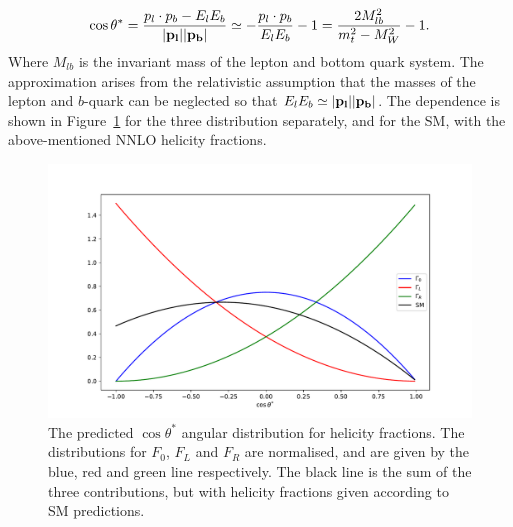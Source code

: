 \documentclass[12pt,a4paper]{article}
\numberwithin{equation}{section}
\begin{document}
\begin{equation}
  \cos \theta^*=\frac{p_l\cdot p_b-E_lE_b}{\abs{\vb{p_l}}\abs{\vb{p_b}}}\\
  \simeq -\frac{p_l\cdot p_b}{E_lE_b} - 1 = \frac{2 M_{lb}^2}{m_t^2 - M_W^2} - 1. \label{eq:costheta}
\end{equation}
Where $M_{lb}$ is the invariant mass of the lepton and bottom quark system. The
approximation arises from the relativistic assumption that the masses of the
lepton and $b$-quark can be neglected so that
$E_lE_b\simeq \abs{\vb{p_l}}\abs{\vb{p_b}}$. The dependence is shown in
Figure~\ref{fig:distributions} for the three distribution separately, and for the
SM, with the above-mentioned NNLO helicity fractions.
\begin{figure}[H]
  \centering
	\includegraphics[width=0.7\linewidth]{figures/angular_dist.pdf}
	\caption{The predicted $\cos \theta^{*}$ angular distribution for helicity
    fractions. The distributions for $F_{0}$, $F_{L}$ and $F_{R}$ are
    normalised, and are given by the blue, red and green line respectively. The
    black line is the sum of the three contributions, but with helicity
    fractions given according to SM predictions.}\label{fig:distributions}
\end{figure}
\end{document}
